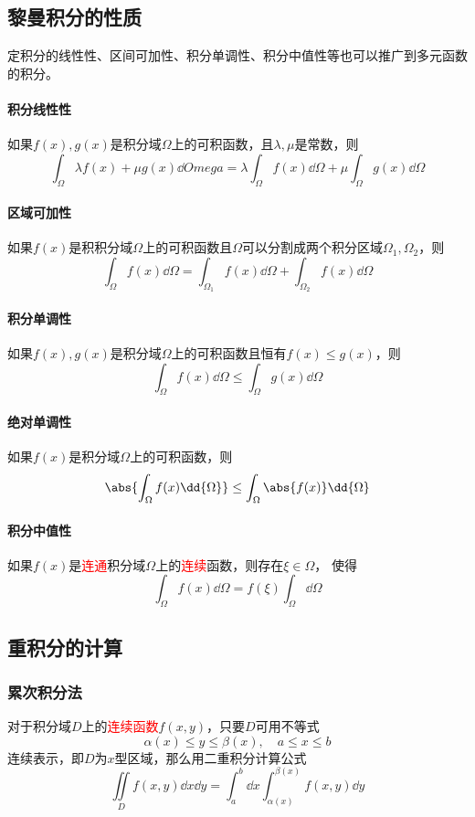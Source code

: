\subsection{黎曼积分的性质}
定积分的线性性、区间可加性、积分单调性、积分中值性等也可以推广到多元函数的积分。
\paragraph{积分线性性}
如果$f(x),g(x)$是积分域$\Omega$上的可积函数，且$\lambda,\mu$是常数，则
\[ \int_\Omega \lambda f(x) + \mu g(x)\dd{Omega} = \lambda\int_\Omega f(x)\dd{\Omega} + \mu\int_\Omega g(x)\dd{\Omega} \]

\paragraph{区域可加性}
如果$f(x)$是积积分域$\Omega$上的可积函数且$\Omega$可以分割成两个积分区域$\Omega_1,\Omega_2$，则
\[ \int_\Omega f(x)\dd{\Omega} = \int_{\Omega_1} f(x)\dd{\Omega} + \int_{\Omega_2} f(x)\dd{\Omega} \]

\paragraph{积分单调性}
如果$f(x),g(x)$是积分域$\Omega$上的可积函数且恒有$f(x)\leq g(x)$，则
\[ \int_\Omega f(x)\dd{\Omega} \leq \int_\Omega g(x)\dd{\Omega} \]

\paragraph{绝对单调性}
如果$f(x)$是积分域$\Omega$上的可积函数，则
\[ \abs{\int_\Omega f(x)\dd{\Omega}} \leq \int_\Omega \abs{f(x)}\dd{\Omega} \]

\paragraph{积分中值性}
如果$f(x)$是\textcolor{red}{连通}积分域$\Omega$上的\textcolor{red}{连续}函数，则存在$\xi\in\Omega$，
使得
\[ \int_\Omega f(x)\dd{\Omega} = f(\xi)\int_\Omega \dd\Omega \]

\subsection{重积分的计算}
\subsubsection{累次积分法}
对于积分域$D$上的\textcolor{red}{连续函数}$f(x,y)$，只要$D$可用不等式
\[ \alpha(x)\leq y \leq \beta(x),\quad a\leq x \leq b \]
连续表示，即$D$为$x$型区域，那么用二重积分计算公式
\begin{equation}
    \iint\limits_D f(x,y)\dd{x}\dd{y} =\int_a^b \dd{x}\int_{\alpha(x)}^{\beta(x)} f(x,y)\dd{y}
\end{equation}

